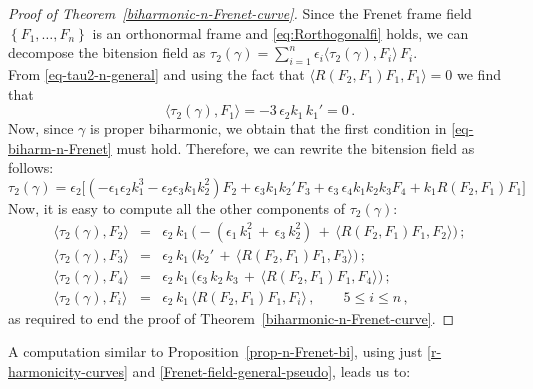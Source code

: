 \documentclass[11pt]{amsart}
\theoremstyle{plain}
\theoremstyle{definition}
\numberwithin{equation}{section}
\begin{document}
\begin{proof}[Proof of Theorem~\ref{biharmonic-n-Frenet-curve}]
Since the Frenet frame field $\left \{F_1,\ldots,F_n \right \}$ is an orthonormal frame and \eqref{eq:Rorthogonalfi} holds, we can decompose the bitension field as $\tau_2(\gamma) = \sum\limits_{i=1}^n \epsilon_i \langle \tau_2(\gamma), F_i \rangle \, F_i$.\\

From \eqref{eq-tau2-n-general} and using the fact that $\langle R(F_2,F_1)F_1, F_1\rangle = 0$ we find that
\begin{equation*}
\langle \tau_2(\gamma), F_1 \rangle = -3 \, \epsilon_2 k_1 \, k_1' =0\,.
\end{equation*}
Now, since $\gamma$ is proper biharmonic, we obtain that the first condition in \eqref{eq-biharm-n-Frenet} must hold. Therefore, we can rewrite the bitension field as follows:
\begin{equation*}
\tau_2(\gamma) = \epsilon_2 \big[ ( - \epsilon_1  \epsilon_2  k_1^3  - \epsilon_2  \epsilon_3  k_1  k_2^2) F_2 +  \epsilon_3  k_1   k_2'  F_3 + \epsilon_3 \, \epsilon_4  k_1  k_2  k_3  F_4 +   k_1  R(F_2, F_1) F_1 \big]
\end{equation*}
Now, it is easy to compute all the other components of $\tau_2(\gamma)$:
\begin{eqnarray*}
\langle \tau_2(\gamma), F_2 \rangle &=& \epsilon_2 \, k_1 \, \big( - ( \epsilon_1 \, k_1^2 \, + \, \epsilon_3 \, k_2^2) \, +  \, \langle R(F_2, F_1) F_1, F_2 \rangle \big) \,; \\
\langle \tau_2(\gamma), F_3 \rangle &=&   \epsilon_2 \, k_1 \, \big(  k_2' \, +  \,  \langle R(F_2, F_1) F_1, F_3 \rangle \big) \,;\\
\langle \tau_2(\gamma), F_4 \rangle &= &\epsilon_2 \, k_1 \, \big(  \epsilon_3 \, k_2 \, k_3 \, +  \, \langle R(F_2, F_1) F_1, F_4 \rangle \big) \,;\\
\langle \tau_2(\gamma), F_i \rangle &=& \epsilon_2 \, k_1 \, \langle R(F_2, F_1) F_1, F_i \rangle \,, \qquad 5 \leq i \leq n\,,
\end{eqnarray*}
as required to end the proof of Theorem~\ref{biharmonic-n-Frenet-curve}.

\end{proof}
A computation similar to Proposition~\ref{prop-n-Frenet-bi}, using just \eqref{r-harmonicity-curves} and \eqref{Frenet-field-general-pseudo}, leads us to:
\end{document}
